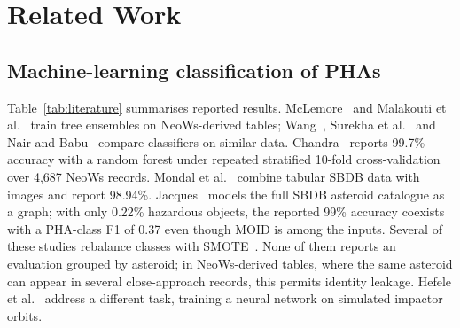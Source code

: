 \documentclass[make,article,submit,moreauthors]{Definitions/mdpi}
\begin{document}
\section{Related Work}

\subsection{Machine-learning classification of PHAs}
Table~\ref{tab:literature} summarises reported results. McLemore~\cite{mclemore2022} and Malakouti et al.~\cite{malakouti2023} train tree ensembles on NeoWs-derived tables; Wang~\cite{wang2023}, Surekha et al.~\cite{surekha2024} and Nair and Babu~\cite{nair2025} compare classifiers on similar data. Chandra~\cite{chandra2025} reports 99.7\% accuracy with a random forest under repeated stratified 10-fold cross-validation over 4,687 NeoWs records. Mondal et al.~\cite{mondal2025} combine tabular SBDB data with images and report 98.94\%. Jacques~\cite{jacques2025} models the full SBDB asteroid catalogue as a graph; with only 0.22\% hazardous objects, the reported 99\% accuracy coexists with a PHA-class F1 of 0.37 even though MOID is among the inputs. Several of these studies rebalance classes with SMOTE~\cite{chawla2002}. None of them reports an evaluation grouped by asteroid; in NeoWs-derived tables, where the same asteroid can appear in several close-approach records, this permits identity leakage. Hefele et al.~\cite{hefele2020} address a different task, training a neural network on simulated impactor orbits.
\end{document}
